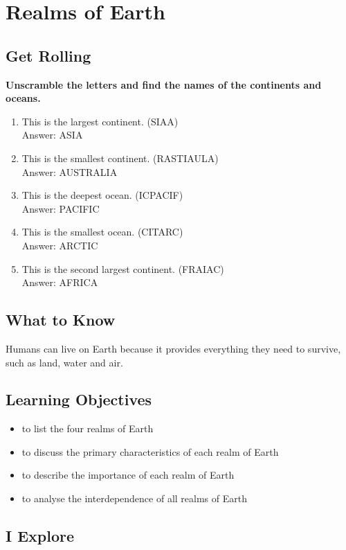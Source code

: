 \chapter{Realms of Earth}
\section{Get Rolling}
\textbf{Unscramble the letters and find the names of the continents and oceans.}
\begin{enumerate}
    \item This is the largest continent. (SIAA)\\
    Answer: ASIA
    \item This is the smallest continent. (RASTIAULA)\\
    Answer: AUSTRALIA
    \item This is the deepest ocean. (ICPACIF)\\
    Answer: PACIFIC
    \item This is the smallest ocean. (CITARC)\\
    Answer: ARCTIC
    \item This is the second largest continent. (FRAIAC)\\
    Answer: AFRICA
\end{enumerate}
\section{What to Know}
Humans can live on Earth because it provides everything they need to survive, such as land, water and air.
\section{\textbf{Learning Objectives}}
\begin{itemize}
    \item to list the four realms of Earth
    \item to discuss the primary characteristics of each realm of Earth
    \item to describe the importance of each realm of Earth
    \item to analyse the interdependence of all realms of Earth
\end{itemize}
\section{I Explore}
